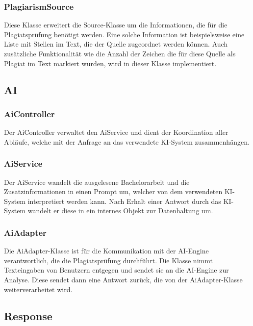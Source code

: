 \subsubsection{PlagiarismSource}\label{subsubsec:plagiarism_source}
Diese Klasse erweitert die Source-Klasse um die Informationen, die für die Plagiatsprüfung benötigt werden.
Eine solche Information ist beispielsweise eine Liste mit Stellen im Text, die der Quelle zugeordnet werden können.
Auch zusätzliche Funktionalität wie die Anzahl der Zeichen die für diese Quelle als Plagiat im Text markiert wurden,
wird in dieser Klasse implementiert.

\subsection{AI}\label{subsec:ai}

\subsubsection{AiController}\label{subsubsec:ai_controller}
Der AiController verwaltet den AiService und dient der Koordination aller Abläufe,
welche mit der Anfrage an das verwendete KI-System zusammenhängen.

\subsubsection{AiService}\label{subsubsec:ai_service}
Der AiService wandelt die ausgelesene Bachelorarbeit und die Zusatzinformationen in einen Prompt um,
welcher von dem verwendeten KI-System interpretiert werden kann.
Nach Erhalt einer Antwort durch das KI-System wandelt er diese in ein internes Objekt zur Datenhaltung um.

\subsubsection{AiAdapter}\label{subsubsec:ai_adapter}
Die AiAdapter-Klasse ist für die Kommunikation mit der AI-Engine verantwortlich, die die Plagiatsprüfung durchführt.
Die Klasse nimmt Texteingaben von Benutzern entgegen und sendet sie an die AI-Engine zur Analyse.
Diese sendet dann eine Antwort zurück, die von der AiAdapter-Klasse weiterverarbeitet wird.

\subsection{Response}\label{subsec:response}

